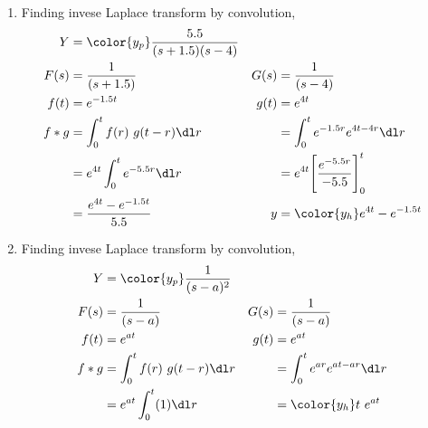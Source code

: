 \begin{enumerate}
    \item Finding invese Laplace transform by convolution,
          \begin{align}
              Y     & = \color{y_p} \frac{5.5}{(s+1.5)(s-4)}              \\
              F(s)  & = \frac{1}{(s + 1.5)}                             &
              G(s)  & = \frac{1}{(s-4)}                                   \\
              f(t)  & = e^{-1.5 t}                                      &
              g(t)  & = e^{4t}                                            \\
              f * g & = \int_{0}^{t} f(r)\ g(t-r) \dl r                 &
                    & = \int_{0}^{t} e^{-1.5r} e^{4t - 4r} \dl r          \\
                    & = e^{4t} \int_{0}^{t} e^{-5.5r} \dl r             &
                    & = e^{4t} \Bigg[ \frac{e^{-5.5r}}{-5.5} \Bigg]_0^t   \\
                    & = \frac{e^{4t} - e^{-1.5t}}{5.5}                  &
              y     & = \color{y_h} e^{4t} - e^{-1.5t}
          \end{align}

    \item Finding invese Laplace transform by convolution,
          \begin{align}
              Y     & = \color{y_p} \frac{1}{(s - a)^2}         \\
              F(s)  & = \frac{1}{(s - a)}                     &
              G(s)  & = \frac{1}{(s - a)}                       \\
              f(t)  & = e^{at}                                &
              g(t)  & = e^{at}                                  \\
              f * g & = \int_{0}^{t} f(r)\ g(t-r) \dl r       &
                    & = \int_{0}^{t} e^{ar} e^{at - ar} \dl r   \\
                    & = e^{at} \int_{0}^{t} (1) \dl r         &
                    & = \color{y_h} t\ e^{at}
          \end{align}


\end{enumerate}
